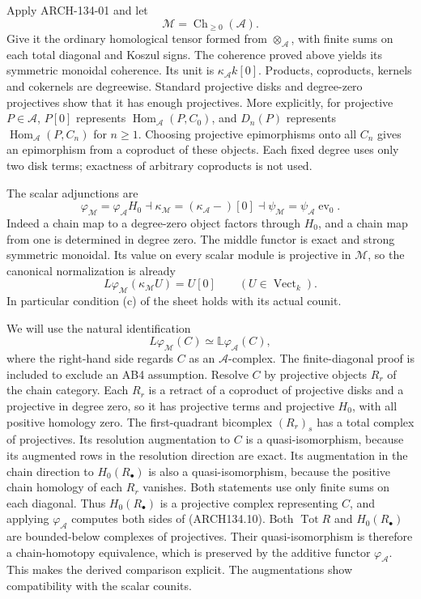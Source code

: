 Apply ARCH-134-01 and let
\[
                    \mathcal M=\operatorname{Ch}_{\ge0}(\mathcal A).
\]
Give it the ordinary homological tensor formed from
$\otimes_{\mathcal A}$, with finite sums on each total diagonal and
Koszul signs.  The coherence proved above yields its symmetric
monoidal coherence.  Its unit is $\kappa_{\mathcal A}k[0]$.
Products, coproducts, kernels and cokernels are degreewise.  Standard
projective disks and degree-zero projectives show that it has enough
projectives.  More explicitly, for projective $P\in\mathcal A$,
$P[0]$ represents $\operatorname{Hom}_{\mathcal A}(P,C_0)$, and
$D_n(P)$ represents $\operatorname{Hom}_{\mathcal A}(P,C_n)$ for
$n\ge1$.  Choosing projective epimorphisms onto all $C_n$ gives an
epimorphism from a coproduct of these objects.  Each fixed degree uses
only two disk terms; exactness of arbitrary coproducts is not used.

The scalar adjunctions are
\[
 \varphi_{\mathcal M}=\varphi_{\mathcal A}H_0
       \dashv\kappa_{\mathcal M}=(\kappa_{\mathcal A}-)[0]
       \dashv\psi_{\mathcal M}=\psi_{\mathcal A}\operatorname{ev}_0.
 \tag{ARCH134.8}
\]
Indeed a chain map to a degree-zero object factors through $H_0$,
and a chain map from one is determined in degree zero.  The middle
functor is exact and strong symmetric monoidal.  Its value on every
scalar module is projective in $\mathcal M$, so the canonical
normalization is already
\[
                 L\varphi_{\mathcal M}(\kappa_{\mathcal M}U)=U[0]
                       \qquad(U\in\operatorname{Vect}_k).
 \tag{ARCH134.9}
\]
In particular condition (c) of the sheet holds with its actual counit.

We will use the natural identification
\[
       L\varphi_{\mathcal M}(C)
                    \simeq\mathbb L\varphi_{\mathcal A}(C),
 \tag{ARCH134.10}
\]
where the right-hand side regards $C$ as an $\mathcal A$-complex.
The finite-diagonal proof is included to exclude an AB4 assumption.
Resolve $C$ by projective objects $R_r$ of the chain category.  Each
$R_r$ is a retract of a coproduct of projective disks and a projective
in degree zero, so it has projective terms and projective $H_0$, with
all positive homology zero.  The first-quadrant bicomplex $(R_r)_s$
has a total complex of projectives.  Its resolution augmentation to
$C$ is a quasi-isomorphism, because its augmented rows in the
resolution direction are exact.  Its augmentation in the chain
direction to $H_0(R_\bullet)$ is also a quasi-isomorphism, because the
positive chain homology of each $R_r$ vanishes.  Both statements use
only finite sums on each diagonal.  Thus $H_0(R_\bullet)$ is a
projective complex representing $C$, and applying
$\varphi_{\mathcal A}$ computes both sides of (ARCH134.10).
Both $\operatorname{Tot}R$ and $H_0(R_\bullet)$ are bounded-below
complexes of projectives.  Their quasi-isomorphism is therefore a
chain-homotopy equivalence, which is preserved by the additive functor
$\varphi_{\mathcal A}$.  This makes the derived comparison explicit.
The augmentations show compatibility with the scalar counits.

